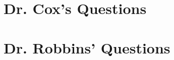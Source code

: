 \documentclass[12pt,letterpaper]{exam}
\begin{document}
\begin{questions}
	\question



	\question 

\begin{comment}
a - Decidedly not, I would argue that this may not even necessarily qual as MARL
b - Def MARL not HARL
c - * Here is were we live. Circumstantially HARL
\end{comment}



	\question
	
	

\end{questions}

\section{Dr. Cox's Questions}
\section{Dr. Robbins' Questions}
\end{document}
